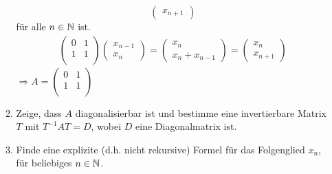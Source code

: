\documentclass{HM}
\begin{document}
\begin{enumerate}
\begin{enumerate}
$$\begin{pmatrix}
			x_{n+1}
		\end{pmatrix}$$ für alle $n\in\mathbb{N}$ ist.\\
		\begin{align*}
			\begin{pmatrix}
				0&1\\
				1&1\\		
			\end{pmatrix}						
			\begin{pmatrix}
				x_{n-1}\\
				x_n
			\end{pmatrix}=\begin{pmatrix}
				x_n\\
				x_n+x_{n-1}
			\end{pmatrix}=\begin{pmatrix}
				x_n\\
				x_{n+1}
			\end{pmatrix}
		\end{align*}	
		$\Rightarrow A=\begin{pmatrix}
				0&1\\
				1&1\\		
			\end{pmatrix}$
			
		\item Zeige, dass $A$ diagonalisierbar ist und bestimme eine invertierbare Matrix $T$ mit $T^{-1}AT=D$, wobei $D$ eine Diagonalmatrix ist.\\
		\item Finde eine explizite (d.h. nicht rekursive) Formel für das Folgenglied $x_n$, für beliebiges $n\in\mathbb{N}$.
		\begin{align*}
			
		\end{align*}
	\end{enumerate}
	\end{enumerate}
\end{document}
